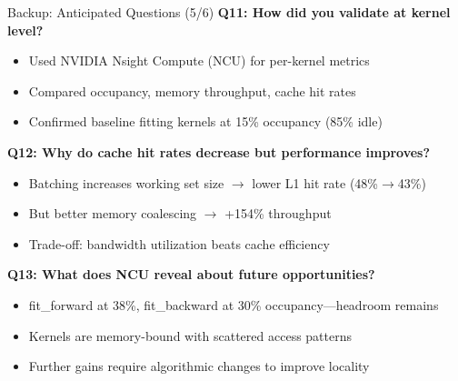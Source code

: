 \documentclass[aspectratio=169, table]{beamer}
\begin{document}
\begin{frame}{Backup: Anticipated Questions (5/6)}
\textbf{Q11: How did you validate at kernel level?}
\begin{itemize}
    \item Used NVIDIA Nsight Compute (NCU) for per-kernel metrics
    \item Compared occupancy, memory throughput, cache hit rates
    \item Confirmed baseline fitting kernels at 15\% occupancy (85\% idle)
\end{itemize}

\vspace{0.4em}
\textbf{Q12: Why do cache hit rates decrease but performance improves?}
\begin{itemize}
    \item Batching increases working set size $\rightarrow$ lower L1 hit rate (48\%$\rightarrow$43\%)
    \item But better memory coalescing $\rightarrow$ +154\% throughput
    \item Trade-off: bandwidth utilization beats cache efficiency
\end{itemize}

\vspace{0.4em}
\textbf{Q13: What does NCU reveal about future opportunities?}
\begin{itemize}
    \item fit\_forward at 38\%, fit\_backward at 30\% occupancy---headroom remains
    \item Kernels are memory-bound with scattered access patterns
    \item Further gains require algorithmic changes to improve locality
\end{itemize}
\end{frame}
\end{document}
